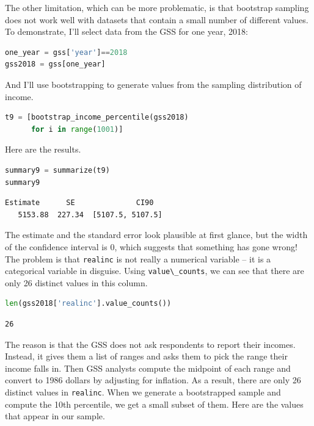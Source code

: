 The other limitation, which can be more problematic, is that bootstrap
sampling does not work well with datasets that contain a small number of
different values. To demonstrate, I'll select data from the GSS for one
year, 2018:

\begin{lstlisting}[language=Python,style=source]
one_year = gss['year']==2018
gss2018 = gss[one_year]
\end{lstlisting}

And I'll use bootstrapping to generate values from the sampling
distribution of income.

\begin{lstlisting}[language=Python,style=source]
t9 = [bootstrap_income_percentile(gss2018)
      for i in range(1001)]
\end{lstlisting}

Here are the results.

\begin{lstlisting}[language=Python,style=source]
summary9 = summarize(t9)
summary9
\end{lstlisting}

\begin{lstlisting}[style=output]
  Estimate      SE              CI90
   5153.88  227.34  [5107.5, 5107.5]
\end{lstlisting}

The estimate and the standard error look plausible at first glance, but
the width of the confidence interval is 0, which suggests that something
has gone wrong! The problem is that \passthrough{\lstinline!realinc!} is
not really a numerical variable -- it is a categorical variable in
disguise. Using \passthrough{\lstinline!value\_counts!}, we can see that
there are only 26 distinct values in this column.

\begin{lstlisting}[language=Python,style=source]
len(gss2018['realinc'].value_counts())
\end{lstlisting}

\begin{lstlisting}[style=output]
26
\end{lstlisting}

The reason is that the GSS does not ask respondents to report their
incomes. Instead, it gives them a list of ranges and asks them to pick
the range their income falls in. Then GSS analysts compute the midpoint
of each range and convert to 1986 dollars by adjusting for inflation. As
a result, there are only 26 distinct values in
\passthrough{\lstinline!realinc!}. When we generate a bootstrapped
sample and compute the 10th percentile, we get a small subset of them.
Here are the values that appear in our sample.

